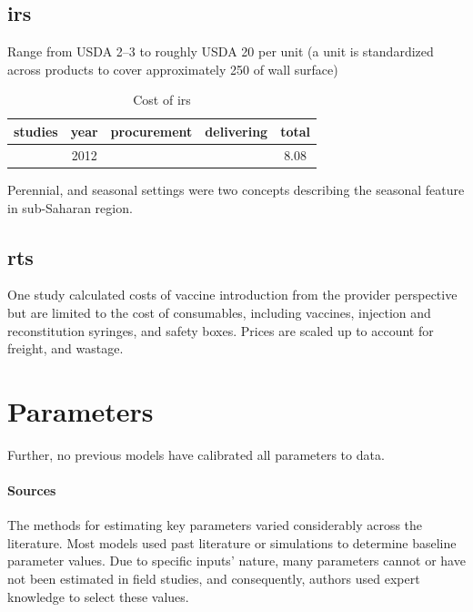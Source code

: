 \documentclass[a4paper, 12pt, twoside]{article}
\begin{document}
\subsection{\texorpdfstring{\gls{irs}}{IRS}}
Range from USDA 2–3 to roughly USDA 20 per unit\cite{Oxborough2016}
(a unit is standardized across products to cover approximately 250 of wall surface)

\begin{table}[htpb]
	\centering
	\caption{Cost of \gls{irs}}
	\label{tab:cost_of_irs}
	\begin{tabular}{cSSSS}
		\toprule
		studies           & {year} & {procurement} & {delivering} & {total} \\
		\midrule
		\cite{Walker2016} & 2012   &               &              & 8.08    \\
		\bottomrule
	\end{tabular}
\end{table}

Perennial, and seasonal settings were two concepts describing the seasonal feature in sub-Saharan region.

\subsection{\texorpdfstring{\gls{rts}}{RTS}}%
\label{sub:rts}
One study\cite{Hay2004} calculated costs of vaccine introduction from the provider perspective but are limited to the cost of consumables, including vaccines, injection and reconstitution syringes, and safety boxes.
Prices are scaled up to account for freight\cite{Winskill2017a}, and wastage\cite{Hutton2006}.

\section{Parameters}
Further, no previous models have calibrated all parameters to data.

\paragraph{Sources}%
\label{par:sources}
The methods for estimating key parameters varied considerably across the literature.
Most models used past literature or simulations to determine baseline parameter values.
Due to specific inputs' nature, many parameters cannot or have not been estimated in field studies, and consequently, authors used expert knowledge to select these values.
\end{document}
